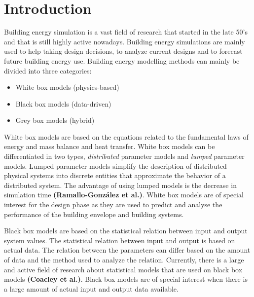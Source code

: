 
\section{Introduction}

Building energy simulation is a vast field of research that started in the late 50’s and that is still highly active nowadays. Building energy simulations are mainly used to help taking design decisions, to analyze current designs and to forecast future building energy use. Building energy modelling methods can mainly be divided into three categories:
\begin{itemize}
  
    \item White box models (physics-based)
    \item Black box models (data-driven)
    \item Grey box models (hybrid)

\end{itemize}


White box models are based on the equations related to the fundamental laws of energy and mass balance and heat transfer. White box models can be differentiated in two types, \emph{distributed} parameter models and \emph{lumped} parameter models. Lumped parameter models simplify the description of distributed physical systems into discrete entities that approximate the behavior of a distributed system. The advantage of using lumped models is the decrease in simulation time \textbf{(Ramallo-González et al.\cite{Alfonso})}. White box models are of special interest for the design phase as they are used to predict and analyse the performance of the building envelope and building systems.

Black box models are based on the statistical relation between input and output system values. The statistical relation between input and output is based on actual data. The relation between the parameters can differ based on the amount of data and the method used to analyze the relation. Currently, there is a large and active field of research about statistical models that are used on black box models \textbf{(Coacley et al.\cite{Coakley})}. Black box models are of special interest when there is a large amount of actual input and output data available. 

